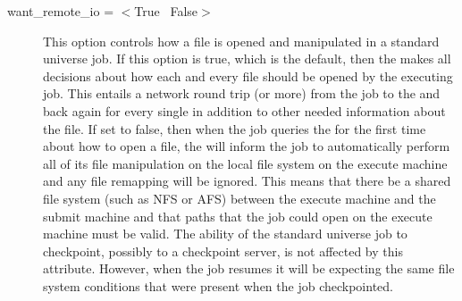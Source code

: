 \begin{description}
\item[want\_remote\_io = $<$True \Bar\ False$>$]
This option controls how a file is opened and manipulated in a standard
universe job.
If this option is true, which is the default, then the 
makes all decisions about how each and every file should be opened by
the executing job.
This entails a network round trip (or more) from the job to the
 and back again for every single 
in addition to other needed information about the file.
If set to false, then when the job queries the  for the
first time about how to open a file, the  will inform the
job to automatically perform all of its file manipulation on the local
file system on the execute machine and any file remapping will be ignored.
This means that there  be a shared file system (such
as NFS or AFS) between the execute machine and the submit machine and that
 paths that the job could open on the execute machine must be valid.
The ability of the standard universe job to checkpoint, possibly to a
checkpoint server, is not affected by this attribute.
However, when the job resumes it will be expecting the same file system
conditions that were present when the job checkpointed.

\end{description} 

